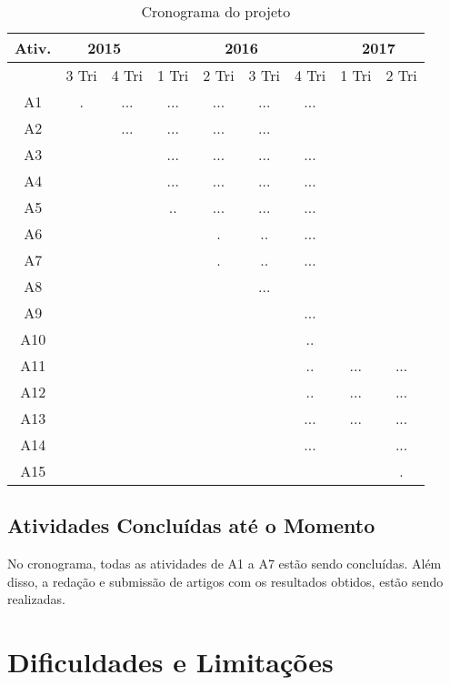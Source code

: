 \begin{table}[h!]
    \centering
    \caption{Cronograma do projeto}
    \label{tab:cronograma}
    \begin{tabular}{|c|c|c|c|c|c|c|c|c|} \hline
        Ativ. &
        \multicolumn{2}{|c|}{2015} &
        \multicolumn{4}{|c|}{2016} &
        \multicolumn{2}{|c|}{2017} \\ \hline
               &
         3 Tri &
         4 Tri &
         1 Tri &
         2 Tri &
         3 Tri &
         4 Tri &
         1 Tri &
         2 Tri \\ \hline
         A1 & . & ... & ... & ... & ... & ... & & \\ \hline
         A2 & & ... & ... & ... & ... & & & \\ \hline
         A3 & & & ... & ... & ... & ... & & \\ \hline
         A4 & & & ... & ... & ... & ... & & \\ \hline
         A5 & & & .. & ... & ... & ... & & \\ \hline
         A6 & & & & . & .. & ... & & \\ \hline
         A7 & & & & . & .. & ... & & \\ \hline
         A8 & & & & & ... & & & \\ \hline
         A9 & & & & & & ... & & \\ \hline
         A10 & & & & & & .. & & \\ \hline
         A11 & & & & & & .. & ... & ... \\ \hline
         A12 & & & & & & .. & ... & ... \\ \hline
         A13 & & & & & & ... & ... & ...\\ \hline
         A14 & & & & & & ... & & ...\\ \hline
         A15 & & & & & & & & . \\ \hline
         
    \end{tabular}
\end{table}

\subsection{Atividades Concluídas até o Momento}

No cronograma, todas as atividades de A1 a A7 estão sendo concluídas. Além disso, a redação e submissão de artigos com os resultados obtidos, estão sendo realizadas.

\section{Dificuldades e Limitações}

